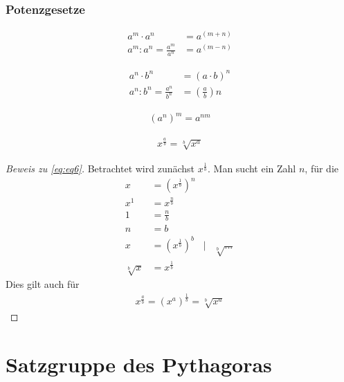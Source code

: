 \documentclass{report}
\newcommand{\x}{\cdot}
\theoremstyle{definition}
\theoremstyle{definition}
\theoremstyle{an}
\theoremstyle{lem}
\theoremstyle{def}
\theoremstyle{def}
\begin{document}
	\subsection{Potenzgesetze}
	\begin{defi}
		\begin{align}
			a^m\x a^n&=a^{(m+n)}\\
			a^m:a^n=\frac{a^m}{a^n}&=a^{(m-n)}
		\end{align}
	\end{defi}
	\begin{defi}
		\begin{align}
			a^n\x b^n&=(a\x b)^n \\
			a^n:b^n = \frac{a^n}{b^n}&=\left( \frac{a}{b} \right)	n
		\end{align}
	\end{defi}
	\begin{defi} [5. Potenzgesetz]
		\begin{align}
			\left(a^n\right)^m=a^{nm}
		\end{align}
	\end{defi}
	\pagebreak
	\begin{defi}
		\begin{align}
			x^\frac{a}{b}=\sqrt[b]{x^a} \label{eq:eq6}
		\end{align}
	\end{defi}
	\begin{proof}[Beweis zu \eqref{eq:eq6}]
		Betrachtet wird zunächst $x^\frac{1}{b}$. Man sucht ein Zahl $n$, für die 
		\begin{align}
			x&=\left(x^\frac{1}{b}\right)^n \\
			x^1&= x^\frac{n}{b} \\
			1&=\frac nb \\
			n&=b \\
			x&=\left(x^\frac{1}{b}\right)^b &|&\sqrt[b]{...}\\
			\sqrt[b]{x}&=x^\frac 1b 
		\end{align}
		Dies gilt auch für 
		\begin{align}
			x^\frac{a}{b}=\left(x^a\right)^\frac{1}{b}=\sqrt[b]{x^a}
		\end{align}
	\end{proof}
	\chapter{Satzgruppe des Pythagoras}
\end{document}
